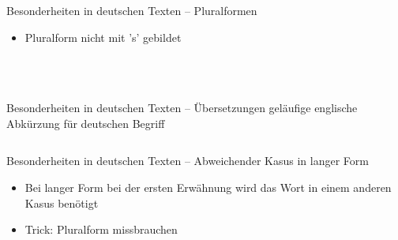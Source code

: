 \documentclass[presentation,aspectratio=169]{beamer}
\begin{document}
\begin{frame}[fragile]{Besonderheiten in deutschen Texten -- Pluralformen}
  \begin{itemize}
    \item Pluralform nicht mit 's' gebildet
  \end{itemize}
  \inputminted[firstline=8,lastline=8]{latex}{codebeispiele/acro-used-acronyms.tex}
  \vspace{2em}
  \begin{columns}
    \begin{column}{.49\textwidth}
      
    \end{column}
    \begin{column}{.5\textwidth}
      \inputminted{latex}{codebeispiele/acro-german-plurals.tex}
    \end{column}
  \end{columns}
\end{frame}

\begin{frame}[fragile]{Besonderheiten in deutschen Texten -- Übersetzungen}
  geläufige englische Abkürzung für deutschen Begriff
  \inputminted[firstline=3,lastline=7]{latex}{codebeispiele/acro-used-acronyms.tex}
  
\end{frame}

\begin{frame}[fragile]{Besonderheiten in deutschen Texten -- Abweichender Kasus in langer Form}
  \begin{itemize}
    \item Bei langer Form bei der ersten Erwähnung wird das Wort in einem anderen Kasus benötigt
    \item Trick: Pluralform missbrauchen
  \end{itemize}
  \inputminted[firstline=9,lastline=12]{latex}{codebeispiele/acro-used-acronyms.tex}
  \vspace{2em}
  \begin{columns}
    \begin{column}{.49\textwidth}
      
    \end{column}
    \begin{column}{.5\textwidth}
      \inputminted{latex}{codebeispiele/acro-german-different-case.tex}
    \end{column}
  \end{columns}
\end{frame}
\end{document}
